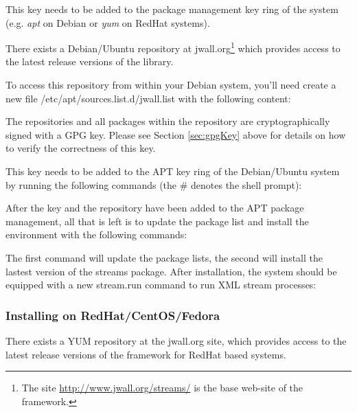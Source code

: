 This key needs to be added to the package management key ring of the
system (e.g. {\em apt} on Debian or {\em yum} on RedHat systems).

There exists a Debian/Ubuntu repository at {\ttfamily
  jwall.org}\footnote{The site \url{http://www.jwall.org/streams/} is
  the base web-site of the \streams framework.} which provides access
to the latest release versions of the \streams library.

To access this repository from within your Debian system, you'll need
create a new file {\ttfamily /etc/apt/sources.list.d/jwall.list} with
the following content:


The repositories and all packages within the repository are
cryptographically signed with a GPG key. Please see Section
\ref{sec:gpgKey} above for details on how to verify the correctness of
this key.

This key needs to be added to the APT key ring of the Debian/Ubuntu
system by running the following commands (the {\ttfamily \#} denotes
the shell prompt):


After the key and the repository have been added to the APT package
management, all that is left is to update the package list and install
the \streams environment with the following commands:


The first command will update the package lists, the second will install
the lastest version of the {\ttfamily streams} package. After installation,
the system should be equipped with a new {\ttfamily stream.run} command
to run XML stream processes:


\subsubsection{\label{sec:installRPM}Installing \streams on RedHat/CentOS/Fedora}
There exists a YUM repository at the {\ttfamily jwall.org} site, which
provides access to the latest release versions of the \streams framework
for RedHat based systems.

